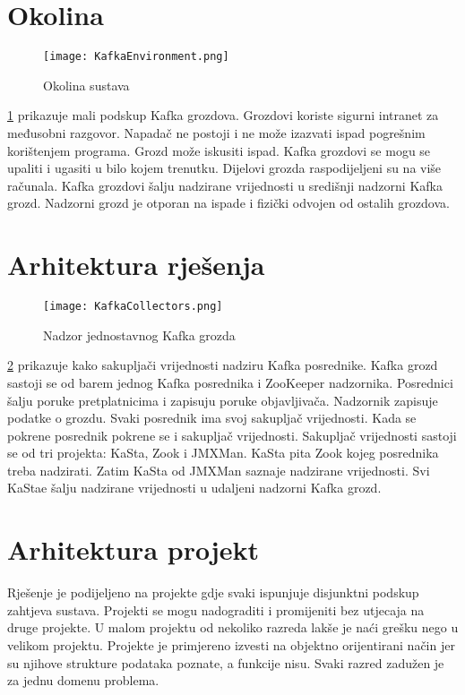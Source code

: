 \documentclass[utf8, diplomski, lmodern, numeric]{fer}
\begin{document}
\section{Okolina}

\begin{figure}[H]
    \centering
    \texttt{[image: KafkaEnvironment.png]}
    \caption{Okolina sustava}
    \label{fig:kafka-environment}
\end{figure}

\ref{fig:kafka-environment} prikazuje mali podskup Kafka grozdova. Grozdovi koriste sigurni intranet za međusobni razgovor. Napadač ne postoji i ne može izazvati ispad pogrešnim korištenjem programa. Grozd može iskusiti ispad. Kafka grozdovi se mogu se upaliti i ugasiti u bilo kojem trenutku. Dijelovi grozda raspodijeljeni su na više računala. Kafka grozdovi šalju nadzirane vrijednosti u središnji nadzorni Kafka grozd. Nadzorni grozd je otporan na ispade i fizički odvojen od ostalih grozdova.


\section{Arhitektura rješenja}

\begin{figure}[H]
    \centering
    \texttt{[image: KafkaCollectors.png]}
    \caption{Nadzor jednostavnog Kafka grozda}
    \label{fig:collectors}
\end{figure}

\ref{fig:collectors} prikazuje kako sakupljači vrijednosti nadziru Kafka posrednike. Kafka grozd sastoji se od barem jednog Kafka posrednika i ZooKeeper nadzornika. Posrednici šalju poruke pretplatnicima i zapisuju poruke objavljivača. Nadzornik zapisuje podatke o grozdu. Svaki posrednik ima svoj sakupljač vrijednosti. Kada se pokrene posrednik pokrene se i sakupljač vrijednosti. Sakupljač vrijednosti sastoji se od tri projekta: KaSta, Zook i JMXMan. KaSta pita Zook kojeg posrednika treba nadzirati. Zatim KaSta od JMXMan saznaje nadzirane vrijednosti. Svi KaStae šalju nadzirane vrijednosti u udaljeni nadzorni Kafka grozd.


\section{Arhitektura projekt}

Rješenje je podijeljeno na projekte gdje svaki ispunjuje disjunktni podskup zahtjeva sustava. Projekti se mogu nadograditi i promijeniti bez utjecaja na druge projekte. U malom projektu od nekoliko razreda lakše je naći grešku nego u velikom projektu. Projekte je primjereno izvesti na objektno orijentirani način jer su njihove strukture podataka poznate, a funkcije nisu. Svaki razred zadužen je za jednu domenu problema.
\end{document}
